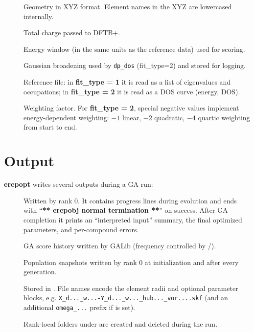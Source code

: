 \begin{description}
\item[] Geometry in XYZ format. Element names in the XYZ are lowercased internally.
\item[] Total charge passed to DFTB+.
\item[] Energy window (in the same units as the reference data) used for scoring.
\item[] Gaussian broadening used by \texttt{dp\_dos} (fit\_type=2) and stored for logging.
\item[] Reference file:
in \textbf{fit\_type = 1} it is read as a list of eigenvalues and occupations;
in \textbf{fit\_type = 2} it is read as a DOS curve (energy, DOS).
\item[] Weighting factor. For \textbf{fit\_type = 2}, special negative values implement
energy-dependent weighting: \(-1\) linear, \(-2\) quadratic, \(-4\) quartic weighting from start to end.
\end{description}

\section{Output}

\textbf{erepopt} writes several outputs during a GA run:

\begin{description}
\item[] Written by rank 0. It contains progress lines during evolution and ends with
``\textbf{** erepobj normal termination **}'' on success. After GA completion it prints an ``interpreted input''
summary, the final optimized parameters, and per-compound errors.

\item[] GA score history written by GALib (frequency controlled by /).
\item[] Population snapshots written by rank 0 at initialization and
after every generation.
\item[] Stored in . File names encode the element radii and optional parameter
blocks, e.g. \texttt{X\_d...\_w...-Y\_d...\_w...\_hub...\_vor....skf} (and an additional \texttt{omega\_...} prefix if  is set).
\item[] Rank-local folders under  are created and deleted during the run.
\end{description}

